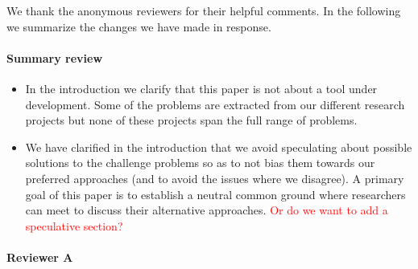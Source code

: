 \documentclass{article}
\begin{document}
We thank the anonymous reviewers for their helpful comments. In the following we summarize the changes we have made in response.

\paragraph{Summary review}{}

\begin{itemize}
\item In the introduction we clarify that this paper is not about a tool under development. Some of the problems are extracted from our different research projects but none of these projects span the full range of problems.

\item We have clarified in the introduction that we avoid speculating about possible solutions to the challenge problems so as to not bias them towards our preferred approaches (and to avoid the issues where we disagree). A primary goal of this paper is to establish a neutral common ground where researchers can meet to discuss their alternative approaches.
\textcolor{red}{Or do we want to add a speculative section?}
\end{itemize}

\paragraph{Reviewer A}{}
\end{document}
